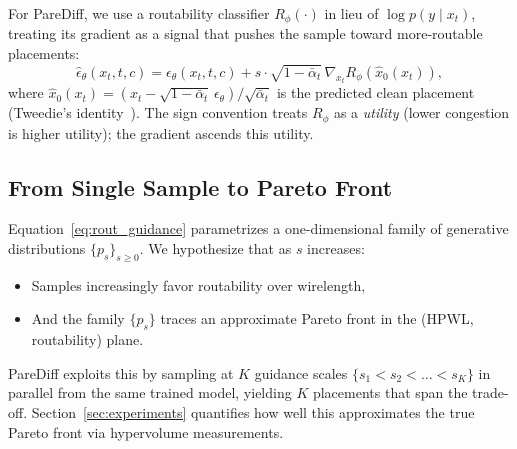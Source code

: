 For PareDiff, we use a routability classifier $R_\phi(\cdot)$ in lieu of $\log p(y \mid x_t)$, treating its gradient as a signal that pushes the sample toward more-routable placements:
\begin{equation}
\hat{\epsilon}_\theta(x_t, t, c) = \epsilon_\theta(x_t, t, c) + s \cdot \sqrt{1 - \bar{\alpha}_t}\, \nabla_{x_t} R_\phi(\hat{x}_0(x_t)),
\label{eq:rout_guidance}
\end{equation}
where $\hat{x}_0(x_t) = (x_t - \sqrt{1 - \bar{\alpha}_t}\, \epsilon_\theta) / \sqrt{\bar{\alpha}_t}$ is the predicted clean placement (Tweedie's identity~\cite{efron2011tweedie}). The sign convention treats $R_\phi$ as a \emph{utility} (lower congestion is higher utility); the gradient ascends this utility.

\subsection{From Single Sample to Pareto Front}

Equation~\ref{eq:rout_guidance} parametrizes a one-dimensional family of generative distributions $\{p_s\}_{s \ge 0}$. We hypothesize that as $s$ increases:
\begin{itemize}
\item Samples increasingly favor routability over wirelength,
\item And the family $\{p_s\}$ traces an approximate Pareto front in the (HPWL, routability) plane.
\end{itemize}

PareDiff exploits this by sampling at $K$ guidance scales $\{s_1 < s_2 < \dots < s_K\}$ in parallel from the same trained model, yielding $K$ placements that span the trade-off. Section~\ref{sec:experiments} quantifies how well this approximates the true Pareto front via hypervolume measurements.
